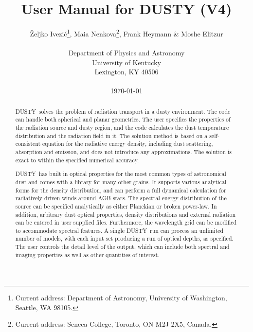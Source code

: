 \documentclass[11pt]{article}
\def\D    {{\sf DUSTY}}
\def\Ivezic {Ivezi\'c}
\begin{document}
\title{User Manual for DUSTY (V4)}

\author{\v Zeljko \Ivezic\footnote{Current address: Department of
    Astronomy, University of Washington, Seattle, WA 98105.}, Maia
  Nenkova\footnote{Current address: Seneca College, Toronto, ON M2J
    2X5, Canada.},
  Frank Heymann \& Moshe Elitzur\\
  \\Department of Physics and Astronomy\\
  University of Kentucky\\
  Lexington, KY 40506\\
  \\ \today
} \date{}

\maketitle \thispagestyle{empty}

\vfil
\begin{abstract}

  {\D\ solves the problem of radiation transport in a dusty
    environment. The code can handle both spherical and planar
    geometries. The user specifies the properties of the radiation
    source and dusty region, and the code calculates the dust
    temperature distribution and the radiation field in it. The
    solution method is based on a self-consistent equation for the
    radiative energy density, including dust scattering, absorption
    and emission, and does not introduce any approximations. The
    solution is exact to within the specified numerical accuracy.

    \D\ has built in optical properties for the most common types of
    astronomical dust and comes with a library for many other
    grains. It supports various analytical forms for the density
    distribution, and can perform a full dynamical calculation for
    radiatively driven winds around AGB stars. The spectral energy
    distribution of the source can be specified analytically as either
    Planckian or broken power-law. In addition, arbitrary dust optical
    properties, density distributions and external radiation can be
    entered in user supplied files.  Furthermore, the wavelength grid
    can be modified to accommodate spectral features.  A single \D\
    run can process an unlimited number of models, with each input set
    producing a run of optical depths, as specified. The user controls
    the detail level of the output, which can include both spectral
    and imaging properties as well as other quantities of interest.}

\end{abstract}
\end{document}
